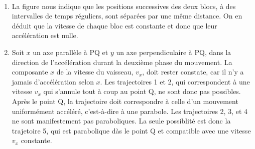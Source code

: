 %
%


\\[-3mm]
\begin{enumerate}
\item La figure nous indique que les positions successives des deux blocs, à des intervalles de temps réguliers, sont séparées par une même distance. On en déduit que la vitesse de chaque bloc est constante et donc que leur accélération est nulle.

\item Soit $x$ un axe parallèle à PQ et $y$ un axe perpendiculaire à PQ, dans la direction de l'accélération durant la deuxième phase du mouvement. La composante $x$ de la vitesse du vaisseau, $v_x$, doit rester constate, car il n'y a jamais d'accélération selon $x$. Les trajectoires 1 et 2, qui correspondent à une vitesse $v_x$ qui s'annule tout à coup au point Q, ne sont donc pas possibles. Après le point Q, la trajectoire doit correspondre à celle d'un mouvement uniformément accéléré, c'est-à-dire à une parabole. Les trajectoires 2, 3, et 4 ne sont manifestement pas paraboliques. La seule possiblité est donc la trajetoire 5, qui est parabolique dàs le point Q et compatible avec une vitesse $v_x$ constante.

\end{enumerate}
